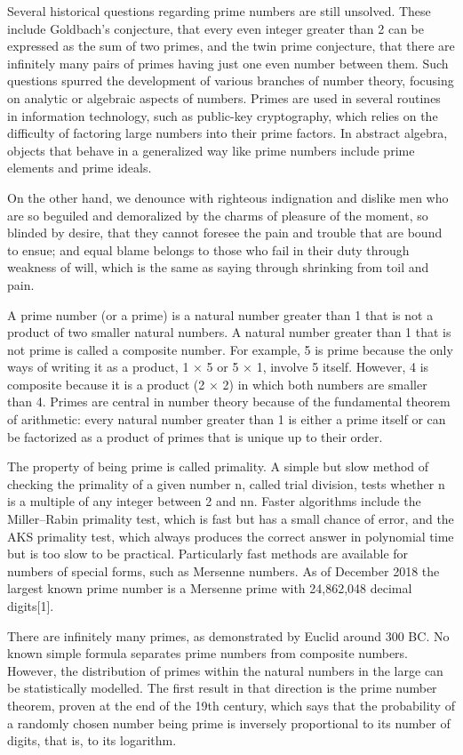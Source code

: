 Several historical questions regarding prime numbers are still unsolved. These
include Goldbach's conjecture, that every even integer greater than 2 can be
expressed as the sum of two primes, and the twin prime conjecture, that there
are infinitely many pairs of primes having just one even number between
them. Such questions spurred the development of various branches of number
theory, focusing on analytic or algebraic aspects of numbers. Primes are used in
several routines in information technology, such as public-key cryptography,
which relies on the difficulty of factoring large numbers into their prime
factors. In abstract algebra, objects that behave in a generalized way like
prime numbers include prime elements and prime ideals.

On the other hand, we denounce with righteous indignation and dislike men who
are so beguiled and demoralized by the charms of pleasure of the moment, so
blinded by desire, that they cannot foresee the pain and trouble that are bound
to ensue; and equal blame belongs to those who fail in their duty through
weakness of will, which is the same as saying through shrinking from toil and
pain.

A prime number (or a prime) is a natural number greater than 1 that is not a
product of two smaller natural numbers. A natural number greater than 1 that is
not prime is called a composite number. For example, 5 is prime because the only
ways of writing it as a product, 1 × 5 or 5 × 1, involve 5 itself. However, 4 is
composite because it is a product (2 × 2) in which both numbers are smaller than
4. Primes are central in number theory because of the fundamental theorem of
arithmetic: every natural number greater than 1 is either a prime itself or can
be factorized as a product of primes that is unique up to their order.

The property of being prime is called primality. A simple but slow method of
checking the primality of a given number n, called trial
division, tests whether n is a multiple of any integer between
2 and { { {n}}}{ {n}}. Faster algorithms include the
Miller–Rabin primality test, which is fast but has a small chance of error, and
the AKS primality test, which always produces the correct answer in polynomial
time but is too slow to be practical. Particularly fast methods are available
for numbers of special forms, such as Mersenne numbers. As of December 2018 the
largest known prime number is a Mersenne prime with 24,862,048 decimal
digits[1].

There are infinitely many primes, as demonstrated by Euclid around 300 BC. No
known simple formula separates prime numbers from composite numbers. However,
the distribution of primes within the natural numbers in the large can be
statistically modelled. The first result in that direction is the prime number
theorem, proven at the end of the 19th century, which says that the probability
of a randomly chosen number being prime is inversely proportional to its number
of digits, that is, to its logarithm.

